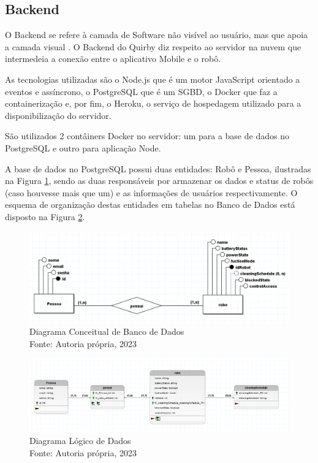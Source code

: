 \subsection{Backend} 

O Backend se refere à camada de Software não visível ao usuário, mas que apoia a camada visual \cite{ewally_2021}. O Backend do Quirby diz respeito ao servidor na nuvem que intermedeia a conexão entre o aplicativo Mobile e o robô. 

As tecnologias utilizadas são o Node.js que é um motor JavaScript orientado a eventos e assíncrono, o PostgreSQL que é um SGBD, o Docker que faz a containerização e, por fim, o Heroku, o serviço de hospedagem utilizado para a disponibilização do servidor.

São utilizados 2 contâiners Docker no servidor: um para a base de dados no PostgreSQL e outro para aplicação Node.

A base de dados no PostgreSQL possui duas entidades: Robô e Pessoa, ilustradas na Figura \ref{diagramaConceitual}, sendo as duas responsáveis por armazenar os dados e status de robôs (caso houvesse mais que um) e as informações de usuários respectivamente. O esquema de organização destas entidades em tabelas no Banco de Dados está disposto na Figura \ref{diagramaLogico}.  

\begin{figure}[h!]
\centering
\includegraphics[scale=0.5]{figuras/software/Quiby_Diagrama_Conceitual.png}
\caption{Diagrama Conceitual de Banco de Dados \\ Fonte: Autoria própria, 2023}
\label{diagramaConceitual}
\end{figure}

\begin{figure}[h!]
\centering
\includegraphics[scale=0.5]{figuras/software/Quirby_Diagrama_Logico.png}
\caption{Diagrama Lógico de Dados \\ Fonte: Autoria própria, 2023}
\label{diagramaLogico}
\end{figure}


